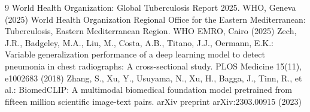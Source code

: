 \documentclass[runningheads]{llncs}
\begin{document}
\begin{thebibliography}{9}
 World Health Organization: Global Tuberculosis Report 2025. WHO, Geneva (2025)
 World Health Organization Regional Office for the Eastern Mediterranean: Tuberculosis, Eastern Mediterranean Region. WHO EMRO, Cairo (2025)
 Zech, J.R., Badgeley, M.A., Liu, M., Costa, A.B., Titano, J.J., Oermann, E.K.: Variable generalization performance of a deep learning model to detect pneumonia in chest radiographs: A cross-sectional study. PLOS Medicine 15(11), e1002683 (2018)
 Zhang, S., Xu, Y., Usuyama, N., Xu, H., Bagga, J., Tinn, R., et al.: BiomedCLIP: A multimodal biomedical foundation model pretrained from fifteen million scientific image-text pairs. arXiv preprint arXiv:2303.00915 (2023)
\end{thebibliography}
\end{document}
